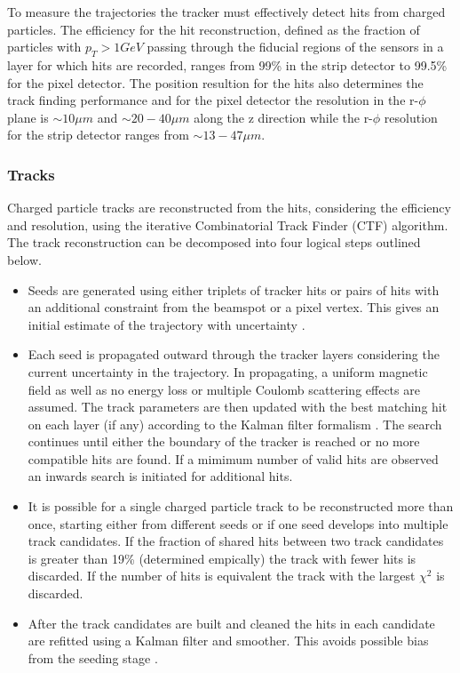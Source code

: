 To measure the trajectories the tracker must effectively detect hits from charged particles. The efficiency for the 
hit reconstruction, defined as the fraction of particles with $p_T > 1 GeV$ passing through the fiducial regions of the sensors
in a layer for which hits are recorded, ranges from 99\% in the strip detector to 99.5\% for the pixel detector.
The position resultion for the hits also determines the track finding performance and for 
the pixel detector the resolution in the r-$\phi$ plane is $\sim10\mu m$ and $\sim20-40\mu m$ along
the z direction while the r-$\phi$ resolution for the strip detector ranges from $\sim13-47\mu m$.

\subsubsection{Tracks}

Charged particle tracks are reconstructed from the hits, considering the efficiency and resolution, 
using the iterative Combinatorial Track Finder (CTF) algorithm. The track reconstruction can be decomposed 
into four logical steps outlined below.

\begin{itemize}
\item Seeds are generated using either triplets of tracker hits or pairs of hits with an additional constraint 
from the beamspot or a pixel vertex. This gives an initial estimate of the trajectory with uncertainty \cite{tracker_early}.
\item Each seed is propagated outward through the tracker layers considering the current uncertainty in the trajectory.
In propagating, a uniform magnetic field as well as no energy loss or multiple Coulomb scattering effects are assumed.
The track parameters are then updated with the best matching hit on each layer (if any) according to the Kalman filter formalism \cite{tracker_vertex}.
The search continues until either the boundary of the tracker is reached or no more compatible hits are found. If a mimimum number
of valid hits are observed an inwards search is initiated for additional hits\cite{tracker_early}.
\item It is possible for a single charged particle track to be reconstructed more than once, starting either from different seeds or if
one seed develops into multiple track candidates. If the fraction of shared hits between two track candidates is greater
than 19\% (determined empically) the track with fewer hits is discarded. If the number of hits is equivalent the track with
 the largest $\chi^2$ is discarded\cite{tracker_vertex}.
\item After the track candidates are built and cleaned the hits in each candidate are refitted using a Kalman filter and smoother. This 
avoids possible bias from the seeding stage \cite{tracker_vertex}.
\end{itemize}

